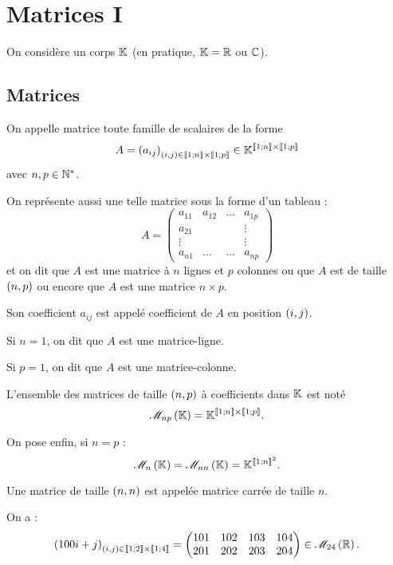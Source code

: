 \chapter{Matrices I}

\minitoc

On considère un corps \(\mathbb{K}\) (en pratique, \(\mathbb{K}=\mathbb{R}\) ou \(\mathbb{C}\)).

\section{Matrices}

\begin{defi}[Matrice]
On appelle matrice toute famille de scalaires de la forme \[A=\left(a_{ij}\right)_{\left(i,j\right)\in\left\llbracket1;n\right\rrbracket\times\left\llbracket1;p\right\rrbracket}\in\mathbb{K}^{\left\llbracket1;n\right\rrbracket\times\left\llbracket1;p\right\rrbracket}\] avec \(n,p\in\mathbb{N}^*\).

On représente aussi une telle matrice sous la forme d'un tableau : \[A=\begin{pmatrix}
a_{11} & a_{12} & \dots & a_{1p} \\
a_{21} &  &  & \vdots \\
\vdots &  &  & \vdots \\
a_{n1} & \dots & \dots & a_{np}
\end{pmatrix}\] et on dit que \(A\) est une matrice à \(n\) lignes et \(p\) colonnes ou que \(A\) est de taille \(\left(n,p\right)\) ou encore que \(A\) est une matrice \(n\times p\).

Son coefficient \(a_{ij}\) est appelé coefficient de \(A\) en position \(\left(i,j\right)\).

Si \(n=1\), on dit que \(A\) est une matrice-ligne.

Si \(p=1\), on dit que \(A\) est une matrice-colonne.

L'ensemble des matrices de taille \(\left(n,p\right)\) à coefficients dans \(\mathbb{K}\) est noté \[\M{np}=\K^{\interventierii{1}{n}\times\interventierii{1}{p}}.\]

On pose enfin, si \(n=p\) : \[\M{n}=\M{nn}=\K^{\interventierii{1}{n}^2}.\]

Une matrice de taille \(\left(n,n\right)\) est appelée matrice carrée de taille \(n\).
\end{defi}

\begin{ex}
On a : \[\paren{100i+j}_{\paren{i,j}\in\interventierii{1}{2}\times\interventierii{1}{4}}=\begin{pmatrix}
101 & 102 & 103 & 104 \\
201 & 202 & 203 & 204
\end{pmatrix}\in\M{24}[\R].\]
\end{ex}


